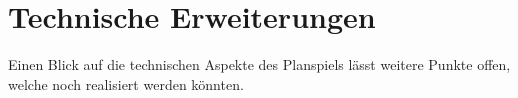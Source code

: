 \section{Technische Erweiterungen }
\label{sec:fazit-fachkonzept}

Einen Blick auf die technischen Aspekte des Planspiels lässt weitere Punkte offen, welche noch realisiert werden könnten. 





